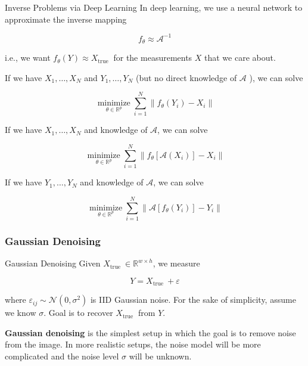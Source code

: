 \begin{frame}[allowframebreaks]

\begin{myconceptblock}{8.2}{Inverse Problems via Deep Learning}
    In deep learning, we use a neural network to approximate the inverse mapping

    $$
    f_{\theta} \approx \mathcal{A}^{-1}
    $$

    i.e., we want $f_{\theta}(Y) \approx X_{\text {true }}$ for the measurements $X$ that we care about.

    If we have $X_{1}, \ldots, X_{N}$ and $Y_{1}, \ldots, Y_{N}$ (but no direct knowledge of $\mathcal{A}$ ), we can solve

    $$
    \underset{\theta \in \mathbb{R}^{p}}{\operatorname{minimize}} \sum_{i=1}^{N}\left\|f_{\theta}\left(Y_{i}\right)-X_{i}\right\|
    $$

    If we have $X_{1}, \ldots, X_{N}$ and knowledge of $\mathcal{A}$, we can solve

    $$
    \underset{\theta \in \mathbb{R}^{p}}{\operatorname{minimize}} \sum_{i=1}^{N}\left\|f_{\theta}\left[\mathcal{A}\left(X_{i}\right)\right]-X_{i}\right\|
    $$

    If we have $Y_{1}, \ldots, Y_{N}$ and knowledge of $\mathcal{A}$, we can solve

    $$
    \underset{\theta \in \mathbb{R}^{p}}{\operatorname{minimize}} \sum_{i=1}^{N}\left\|\mathcal{A}\left[f_{\theta}\left(Y_{i}\right)\right]-Y_{i}\right\|
    $$
\end{myconceptblock}

\end{frame}

\subsubsection{Gaussian Denoising}

\begin{frame}[allowframebreaks]

\begin{mydefinitionblock}{8.3}{Gaussian Denoising}
    Given $X_{\text {true }} \in \mathbb{R}^{w \times h}$, we measure

    $$
    Y=X_{\text {true }}+\varepsilon
    $$

    where $\varepsilon_{i j} \sim \mathcal{N}\left(0, \sigma^{2}\right)$ is IID Gaussian noise. For the sake of simplicity, assume we know $\sigma$. Goal is to recover $X_{\text {true }}$ from $Y$.

    \textbf{Gaussian denoising} is the simplest setup in which the goal is to remove noise from the image. In more realistic setups, the noise model will be more complicated and the noise level $\sigma$ will be unknown.
\end{mydefinitionblock}

\end{frame}

